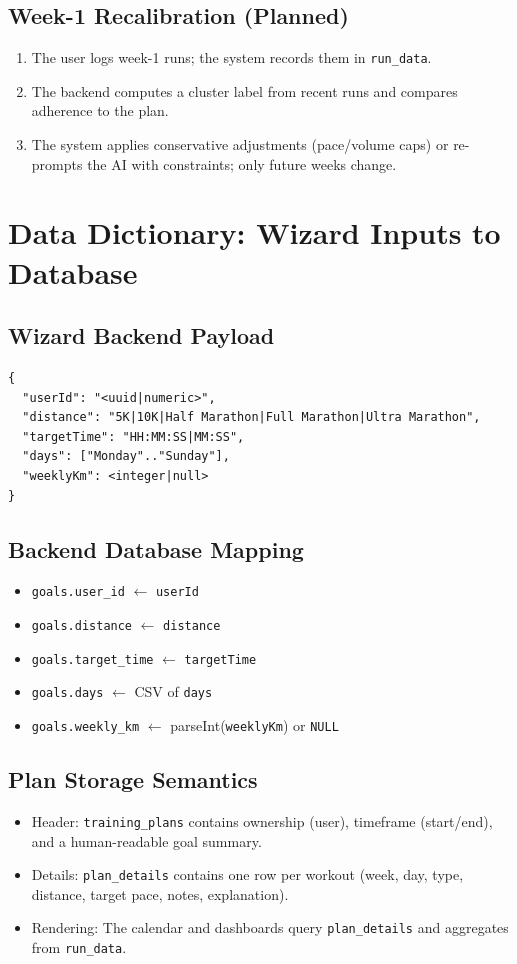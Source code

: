 \subsection*{Week-1 Recalibration (Planned)}
\begin{enumerate}
  \item The user logs week-1 runs; the system records them in \texttt{run\_data}.
  \item The backend computes a cluster label from recent runs and compares adherence to the plan.
  \item The system applies conservative adjustments (pace/volume caps) or re-prompts the AI with constraints; only future weeks change.
\end{enumerate}

\section{Data Dictionary: Wizard Inputs to Database}

\subsection*{Wizard \textrightarrow{} Backend Payload}
\begin{verbatim}
{
  "userId": "<uuid|numeric>",
  "distance": "5K|10K|Half Marathon|Full Marathon|Ultra Marathon",
  "targetTime": "HH:MM:SS|MM:SS",
  "days": ["Monday".."Sunday"],
  "weeklyKm": <integer|null>
}
\end{verbatim}

\subsection*{Backend \textrightarrow{} Database Mapping}
\begin{itemize}
  \item \texttt{goals.user\_id} \(\leftarrow\) \texttt{userId}
  \item \texttt{goals.distance} \(\leftarrow\) \texttt{distance}
  \item \texttt{goals.target\_time} \(\leftarrow\) \texttt{targetTime}
  \item \texttt{goals.days} \(\leftarrow\) CSV of \texttt{days}
  \item \texttt{goals.weekly\_km} \(\leftarrow\) parseInt(\texttt{weeklyKm}) or \texttt{NULL}
\end{itemize}

\subsection*{Plan Storage Semantics}
\begin{itemize}
  \item Header: \texttt{training\_plans} contains ownership (user), timeframe (start/end), and a human-readable goal summary.
  \item Details: \texttt{plan\_details} contains one row per workout (week, day, type, distance, target pace, notes, explanation).
  \item Rendering: The calendar and dashboards query \texttt{plan\_details} and aggregates from \texttt{run\_data}.
\end{itemize}

